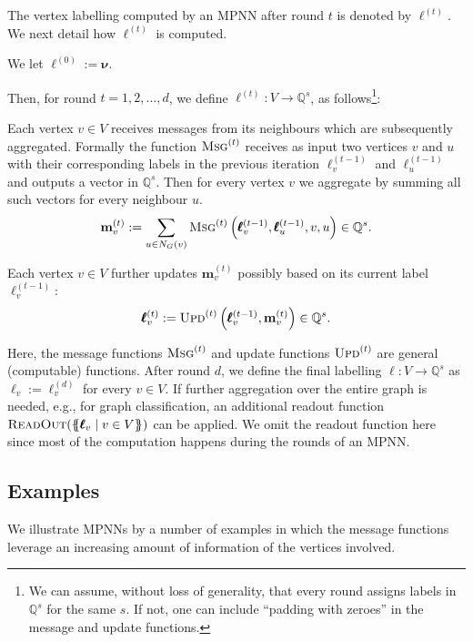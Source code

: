 The vertex labelling computed by an MPNN after round $t$ is denoted by $\pmb{\ell}^{(t)}$. We next detail how $\pmb{\ell}^{(t)}$ is computed.
\begin{description}\setlength{\itemsep}{-0.4ex}
\item [Initialisation.]  We let $\pmb{\ell}^{(0)}:=\pmb{\nu}$.
\end{description}
Then, for round $t=1,2,\ldots,d$, we define $\pmb{\ell}^{(t)}:V\to\mathbb{Q}^{s}$, as follows\footnote{We can assume, without loss of generality, that every round assigns labels in $\mathbb{Q}^s$ for the same $s$. If not, one can include ``padding with zeroes'' in the message and update functions.}:
\begin{description}\setlength{\itemsep}{-0.4ex}
\item [Message Passing.] Each vertex $v\in V$ receives messages from its neighbours which are subsequently aggregated. Formally the function $\textsc{Msg}^{(t)}$ receives as input two vertices $v$ and $u$ with their corresponding labels in the previous iteration $\pmb{\ell}^{(t-1)}_v$ and $\pmb{\ell}^{(t-1)}_u$ and outputs a vector in $\mathbb{Q}^s$. Then for every vertex $v$ we aggregate by summing all such vectors for every neighbour $u$.
$$
\mathbf{m}^{(t)}_{v}:=\sum_{u\in N_G(v)}\textsc{Msg}^{(t)}\left(\pmb{\ell}^{(t-1)}_v,\pmb{\ell}^{(t-1)}_u,v,u\right)\in\mathbb{Q}^{s}.
$$
\item [Updating.] Each vertex $v\in V$ further updates $\mathbf{m}^{(t)}_{v}$ possibly based on its current label $\pmb{\ell}^{(t-1)}_v$:
$$
\pmb{\ell}^{(t)}_v:=\textsc{Upd}^{(t)}\left(\pmb{\ell}^{(t-1)}_v,\mathbf{m}^{(t)}_{v}\right)\in\mathbb{Q}^{s}.
$$
\end{description}
Here, the message functions $\textsc{Msg}^{(t)}$ and update functions
$\textsc{Upd}^{(t)}$ are general (computable) functions. After round $d$, we
define the final labelling $\pmb{\ell}:V\to\mathbb{Q}^{s}$ as
$\pmb{\ell}_v:=\pmb{\ell}^{(d)}_v$ for every $v\in V$. If further aggregation
over the entire graph is needed, e.g., for graph classification, an additional
readout function $\textsc{ReadOut}(\{\!\!\{\pmb{\ell}_v\mid v\in V\}\!\!\})$ can be
applied. We omit the readout function here since most of the computation
happens during the rounds of an MPNN.

\subsection{Examples}
We illustrate MPNNs by a number of examples in which the message functions leverage an increasing amount of information of the vertices involved. 

